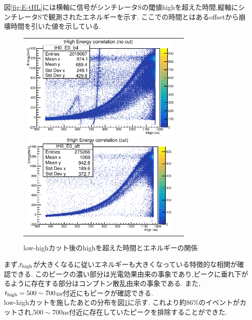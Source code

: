 図\ref{fig:E-tHL}には横軸に信号がシンチレータSの閾値highを超えた時間,縦軸にシンチレータSで観測されたエネルギーを示す.
ここでの時間とはあるoffsetから崩壊時間を引いた値を示している.
\begin{figure}[H]
	\begin{tabular}{cc}
		\begin{minipage}{0.5\hsize}
			\begin{center}
				\includegraphics[width=80mm]{fig/isb/E-tHL.pdf}
				\caption{閾値highを超えた時間とエネルギーの関係}
				\label{fig:E-tHL}
			\end{center}
		\end{minipage}
		\begin{minipage}{0.5\hsize}
			\begin{center}
				\includegraphics[width=80mm]{fig/isb/E-tHL_cut.pdf}
				\caption{low-highカット後のhighを超えた時間とエネルギーの関係}
				\label{fig:E-tHL_cut}
			\end{center}
		\end{minipage}
	\end{tabular}
\end{figure}
まず,$t_{\rm high}$が大きくなるに従いエネルギーも大きくなっている特徴的な相関が確認できる.
このピークの濃い部分は光電効果由来の事象であり,ピークに垂れ下がるように存在する部分はコンプトン散乱由来の事象である.
また,$t_{\rm high}=500\sim700$ns付近にもピークが確認できる.\\
low-highカットを施したあとの分布を図\ref{fig:E-tHL_cut}に示す.
これより約86\%のイベントがカットされ,$500\sim700$ns付近に存在していたピークを排除することができた.

